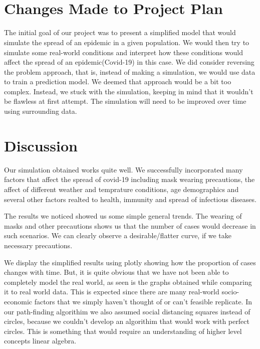 \documentclass{article}
\begin{document}
\\\












\section{Changes Made to Project Plan}
The initial goal of our project was to present a simplified model that would simulate the spread of an epidemic in a given population. We would then try to simulate some real-world conditions and interpret how these conditions would affect the spread of an epidemic(Covid-19) in this case. We did consider reversing the problem approach, that is, instead of making a simulation, we would use data to train a prediction model. We deemed that approach would be a bit too complex. Instead, we stuck with the simulation, keeping in mind that it wouldn’t be flawless at first attempt. The simulation will need to be improved over time using surrounding data.
\bigskip

\section{Discussion}
Our simulation obtained works quite well. We successfully incorporated many factors that affect the spread of covid-19 including mask wearing precautions, the affect of different weather and temprature conditions, age demographics and several other factors realted to health, immunity and spread of infectious diseases.

The results we noticed showed us some simple general trends. The wearing of masks and other precautions shows us that the number of cases would decrease in such scenarios. We can clearly observe a desirable/flatter curve, if we take necessary precautions.

We display the simplified results using plotly showing how the proportion of cases changes with time. But, it is quite obvious that we have not been able to completely model the real world, as seen is the graphs obtained while comparing it to real world data. This is expected since there are many real-world socio-economic factors that we simply haven't thought of or can't feasible replicate. In our path-finding algorithim we also assumed social distancing squares instead of circles, because we couldn't develop an algorithim that would work with perfect circles. This is something that would require an understanding of higher level concepts linear algebra.
\end{document}
